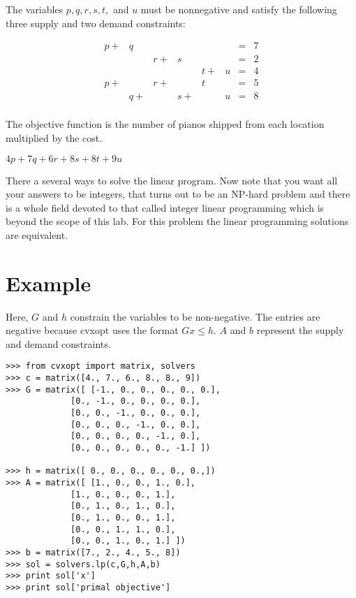 The variables $p,q,r,s,t,$ and $u$ must be nonnegative and satisfy the following three supply and two demand constraints:

\begin{align}
p +& q  &    &    &    &   &=& 7\\
   &    & r +& s  &    &   &=& 2\\
   &    &    &    & t +& u &=& 4\\
p +&    & r +&    & t  &   &=& 5\\
   & q +&    & s +&    & u &=& 8\\
\end{align}

The objective function is the number of pianos shipped from each location multiplied by the cost.

\begin{center}
$4p + 7q + 6r + 8s + 8t + 9u$
\end{center}

There a several ways to solve the linear program. Now note that you want all your answers to be integers, that turns out to be an NP-hard problem and there is a whole field devoted to that called integer linear programming which is beyond the scope of this lab. For this problem the linear programming solutions are equivalent. 

\section*{Example}
Here, $G$ and $h$ constrain the variables to be non-negative.
The entries are negative because cvxopt uses the format $Gx \leq h$.
$A$ and $b$ represent the supply and demand constraints.


\begin{lstlisting}
>>> from cvxopt import matrix, solvers
>>> c = matrix([4., 7., 6., 8., 8., 9])
>>> G = matrix([ [-1., 0., 0., 0., 0., 0.],
             [0., -1., 0., 0., 0., 0.],
             [0., 0., -1., 0., 0., 0.],
             [0., 0., 0., -1., 0., 0.],
             [0., 0., 0., 0., -1., 0.],
             [0., 0., 0., 0., 0., -1.] ])
        
>>> h = matrix([ 0., 0., 0., 0., 0., 0.,])
>>> A = matrix([ [1., 0., 0., 1., 0.],
             [1., 0., 0., 0., 1.],
             [0., 1., 0., 1., 0.],
             [0., 1., 0., 0., 1.],
             [0., 0., 1., 1., 0.],
             [0., 0., 1., 0., 1.] ])
>>> b = matrix([7., 2., 4., 5., 8]) 
>>> sol = solvers.lp(c,G,h,A,b)  
>>> print sol['x']
>>> print sol['primal objective']
\end{lstlisting}


